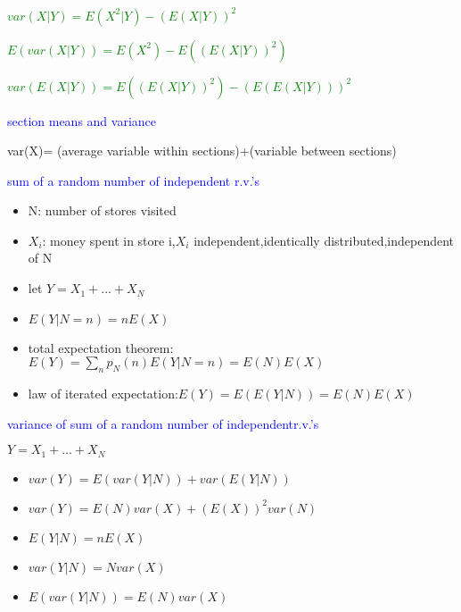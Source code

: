 \textcolor{green}{$var(X|Y)=E(X^2|Y)-(E(X|Y))^2$}

\textcolor{green}{$E(var(X|Y))=E(X^2)-E((E(X|Y))^2)$}

\textcolor{green}{$var(E(X|Y))=E((E(X|Y))^2)-(E(E(X|Y)))^2$}


\textcolor{blue}{section means and variance}

var(X)= (average variable within sections)+(variable between sections)

\textcolor{blue}{sum of a random number of independent r.v.'s}

\begin{itemize}
    \item N: number of stores visited
    \item $X_i$: money spent in store i,$X_i$ independent,identically distributed,independent of N
    \item let $Y=X_1+...+X_N$ 
    \item $E(Y|N=n)=n E(X)$
    \item total expectation theorem:$E(Y)=\sum_n p_N(n)E(Y|N=n)=E(N)E(X)$
    \item law of iterated expectation:$E(Y)=E(E(Y|N))=E(N)E(X)$
\end{itemize}

\textcolor{blue}{variance of sum of a random number of independentr.v.'s}

$Y=X_1+...+X_N$

\begin{itemize}
    \item $var(Y)=E(var(Y|N))+var(E(Y|N))$
    \item $var(Y)=E(N)var(X)+(E(X))^2var(N)$
    \item $E(Y|N)=n E(X)$
    \item $var(Y|N)=Nvar(X)$
    \item $E(var(Y|N))=E(N)var(X)$
\end{itemize}

